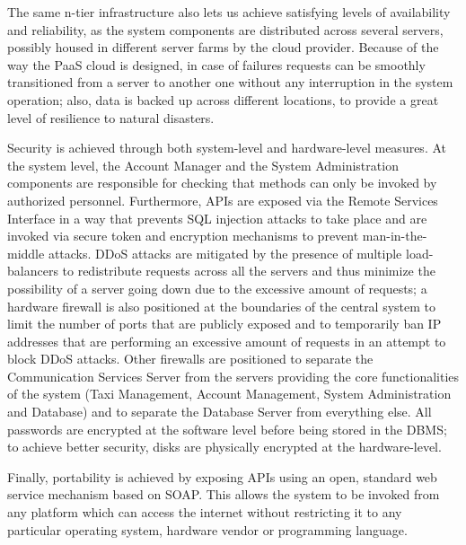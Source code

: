The same n-tier infrastructure also lets us achieve satisfying levels of availability and reliability, as the system components are distributed across several servers, possibly housed in different server farms by the cloud provider. Because of the way the PaaS cloud is designed, in case of failures requests can be smoothly transitioned from a server to another one without any interruption in the system operation; also, data is backed up across different locations, to provide a great level of resilience to natural disasters.

Security is achieved through both system-level and hardware-level measures. At the system level, the Account Manager and the System Administration components are responsible for checking that methods can only be invoked by authorized personnel. Furthermore, APIs are exposed via the Remote Services Interface in a way that prevents SQL injection attacks to take place and are invoked via secure token and encryption mechanisms to prevent man-in-the-middle attacks. DDoS attacks are mitigated by the presence of multiple load-balancers to redistribute requests across all the servers and thus minimize the possibility of a server going down due to the excessive amount of requests; a hardware firewall is also positioned at the boundaries of the central system to limit the number of ports that are publicly exposed and to temporarily ban IP addresses that are performing an excessive amount of requests in an attempt to block DDoS attacks. Other firewalls are positioned to separate the Communication Services Server from the servers providing the core functionalities of the system (Taxi Management, Account Management, System Administration and Database) and to separate the Database Server from everything else. All passwords are encrypted at the software level before being stored in the DBMS; to achieve better security, disks are physically encrypted at the hardware-level.

Finally, portability is achieved by exposing APIs using an open, standard web service mechanism based on SOAP. This allows the system to be invoked from any platform which can access the internet without restricting it to any particular operating system, hardware vendor or programming language.